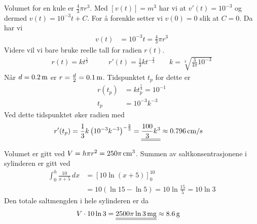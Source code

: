 \documentclass[a4paper,norsk,12pt]{article}
\begin{document}
Volumet for en kule er $\frac{4}{3}\pi r^3$. Med $[v(t)] = \unit{m^3}$ har vi
at $v'(t) = 10^{-3}$ og dermed $v(t) = 10^{-3}t + C$.
For å forenkle setter vi $v(0)=0$ slik at $C=0$. Da har vi
\begin{align*}
  v(t) &= 10^{-3}t = \frac{4}{3}\pi r^3
\end{align*}
Videre vil vi bare bruke reelle tall for radien $r(t)$.
\begin{align*}
  r(t) = kt^\frac{1}{3} & \qquad
    r'(t)  = \frac{1}{3}kt^{-\frac{2}{3}} \qquad
      k  = \sqrt[3]{\frac{3}{4\pi}10^{-3}}
\end{align*}
Når $d=\unit[0.2]{m}$ er $r=\frac{d}{2}=\unit[0.1]{m}$. Tidspunktet $t_p$ for
dette er
\begin{align*}
  r(t_p) &= kt_p^\frac{1}{3} = 10^{-1} \\
  t_p &= 10^{-3}k^{-3}
\end{align*}
Ved dette tidspunktet øker radien med
\begin{align*}
  r'(t_p) &= \frac{1}{3}k\left(10^{-3}k^{-3}\right)^{-\frac{2}{3}} =
  \svar{\frac{100}{3}k^3} \approx \unit[0.796]{cm/s}
\end{align*}

Volumet er gitt ved $V=h\pi r^2 = \unit[250\pi]{cm^3}$. Summen av
saltkonsentrasjonene i sylinderen er gitt ved
\begin{align*}
  \int_0^h{\frac{10}{x+5}\,dx} &= \left[10\ln{(x+5)}\right]_0^{10} \\
    &= 10(\ln{15}-\ln{5}) = 10\ln{\frac{15}{5}} = 10\ln{3}
\end{align*}
Den totale saltmengden i hele sylinderen er da
\begin{align*}
  V\cdot10\ln{3} &= \svar{\unit[2500\pi\ln{3}]{mg}} \approx \unit[8.6]{g}
\end{align*}
\end{document}
